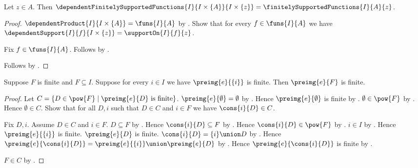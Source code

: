 \begin{theorem}\label{constant_family_finite_support_space}
    Let $z\in A$.
    Then
        $\dependentFinitelySupportedFunctions
            {I}{I\times\{A\}}{I\times\{z\}}
        =\finitelySupportedFunctions{I}{A}{z}$.
\end{theorem}
\begin{proof}
    $\dependentProduct{I}{I\times\{A\}}=\funs{I}{A}$ by
        .
    Show that for every $f\in\funs{I}{A}$ we have
        $\dependentSupport{I}{f}{I\times\{z\}}
            =\supportOn{I}{f}{z}$.
    \begin{subproof}
        Fix $f\in\funs{I}{A}$.
        Follows by .
    \end{subproof}
    Follows by
        .
\end{proof}

\begin{theorem}\label{finite_preimage_under_finite_fibers}
    Suppose $F$ is finite and $F\subseteq I$.
    Suppose for every $i\in I$ we have $\preimg{e}{\{i\}}$ is finite.
    Then $\preimg{e}{F}$ is finite.
\end{theorem}
\begin{proof}
    Let $C=\{D\in\pow{F}\mid
        \text{$\preimg{e}{D}$ is finite}\}$.
    $\preimg{e}{\emptyset}=\emptyset$ by
        .
    Hence $\preimg{e}{\emptyset}$ is finite by
        .
    $\emptyset\in\pow{F}$ by .
    Hence $\emptyset\in C$.
    Show that for all $D,i$ such that $D\in C$ and $i\in F$ we have
        $\cons{i}{D}\in C$.
    \begin{subproof}
        Fix $D,i$.
        Assume $D\in C$ and $i\in F$.
        $D\subseteq F$ by .
        Hence $\cons{i}{D}\subseteq F$ by
            .
        Hence $\cons{i}{D}\in\pow{F}$ by
            .
        $i\in I$ by .
        Hence $\preimg{e}{\{i\}}$ is finite.
        $\preimg{e}{D}$ is finite.
        $\cons{i}{D}=\{i\}\union D$ by
            .
        Hence
            $\preimg{e}{\cons{i}{D}}
                =\preimg{e}{\{i\}}\union\preimg{e}{D}$ by
            .
        Hence $\preimg{e}{\cons{i}{D}}$ is finite by
            .
    \end{subproof}
    $F\in C$ by .
\end{proof}

